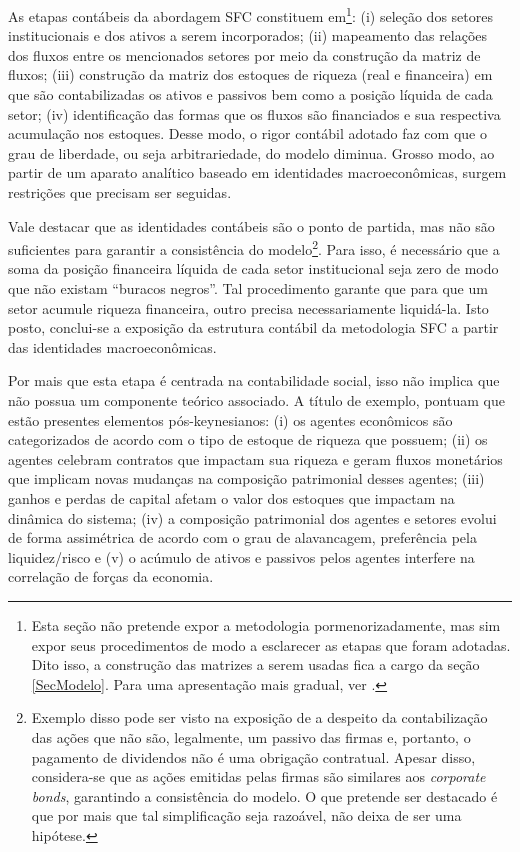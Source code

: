 As etapas contábeis da abordagem SFC constituem em\footnote{Esta seção não pretende expor a metodologia pormenorizadamente, mas sim expor seus procedimentos de modo a esclarecer as etapas que foram adotadas. Dito isso, a construção das matrizes a serem usadas fica a cargo da seção \ref{SecModelo}. Para uma apresentação mais gradual, ver \textcite[Capítulo 4]{da_silveira_politica_2017}.}: (i) seleção dos setores institucionais e dos ativos a serem incorporados; (ii) mapeamento das relações dos fluxos entre os mencionados setores por meio da construção da matriz de fluxos; (iii) construção da matriz dos estoques de riqueza (real e financeira) em que são contabilizadas os ativos e passivos  bem como a posição líquida de cada setor; (iv) identificação das formas que os fluxos são financiados e sua respectiva acumulação nos estoques. Desse modo, o rigor contábil adotado faz com que o grau de liberdade, ou seja arbitrariedade, do modelo diminua. 
Grosso modo, ao partir de um aparato analítico baseado em identidades macroeconômicas, surgem restrições que precisam ser seguidas.

Vale destacar que as identidades contábeis são o ponto de partida, mas não são suficientes para garantir a consistência do modelo\footnote{Exemplo disso pode ser visto na exposição de  \textcite[p.~27--8]{godley_monetary_2007}  a despeito da contabilização das ações que não são, legalmente, um passivo das firmas e, portanto, o pagamento de dividendos não é uma obrigação contratual. Apesar disso, considera-se que as ações emitidas pelas firmas são similares aos \textit{corporate bonds}, garantindo a consistência do modelo. O que pretende ser destacado é que por mais que tal simplificação seja razoável, não deixa de ser uma hipótese.}. Para isso, é necessário que a soma da posição financeira líquida de cada setor institucional seja zero de modo que não existam ``buracos negros''. Tal procedimento garante que para que um setor acumule riqueza financeira, outro precisa necessariamente liquidá-la. Isto posto, conclui-se a exposição da estrutura contábil da metodologia SFC a partir das identidades macroeconômicas. 

Por mais que esta etapa é centrada na contabilidade social, isso não implica que não possua um componente teórico associado. A título de exemplo, \textcite[p.~15--16]{macedo_e_silva_peering_2011}  pontuam que estão presentes elementos pós-keynesianos: (i) os agentes econômicos são categorizados de acordo com o tipo de estoque de riqueza que possuem; (ii) os agentes celebram contratos que impactam sua riqueza e geram fluxos monetários que implicam novas mudanças na composição patrimonial desses agentes; (iii) ganhos e perdas de capital afetam o valor dos estoques que impactam na dinâmica do sistema; (iv) a composição patrimonial dos agentes e setores evolui de forma assimétrica de acordo com o grau de alavancagem, preferência
pela liquidez/risco e (v) o acúmulo de ativos e passivos pelos agentes interfere na correlação de forças da economia. 

